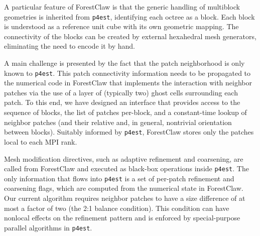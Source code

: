 \documentclass{IOS-Book-Article}     %
\newcommand{\comment}[1]{\textcolor{green}{[DAC: #1]}\xspace}
\newcommand{\clawpack}{{\sc Clawpack}\xspace}
\newcommand{\forestclaw}{ForestClaw\xspace}
\newcommand{\pforest}{\texttt{p4est}\xspace}
\newcommand{\ignore}[1]{}
\begin{document}
A particular feature of \forestclaw is that the generic handling of multiblock
geometries is inherited from \pforest, identifying each octree as a block.
Each block is understood as a reference unit cube with
its own geometric mapping.  The connectivity of the blocks can be created by
external hexahedral mesh generators, eliminating the need to encode it by hand.

A main challenge is presented by the fact that the patch neighborhood
is only known to \pforest.  This patch connectivity information needs
to be propagated to the numerical code in \forestclaw that implements
the interaction with neighbor patches via the use of a layer of (typically two)
ghost cells surrounding each patch.  To this end, we have designed an
interface that provides \ignore{read-only} access to the sequence of blocks, the list of
patches per-block, and a constant-time lookup of neighbor patches (and their
relative and, in general, nontrivial orientation between blocks).
Suitably informed by \pforest, \forestclaw stores only the patches local to
each MPI rank.

Mesh modification directives, such as adaptive refinement and coarsening, are
called from \forestclaw and executed as black-box operations inside \pforest.
The only information that flows into \pforest is a set of per-patch
refinement and coarsening flags, which are computed from the numerical state in
\forestclaw.  Our current algorithm requires neighbor patches to have a size
difference of at most a factor of two (the 2:1 balance condition).  This condition
can have nonlocal effects on the refinement pattern and is enforced by
special-purpose parallel algorithms in \pforest \cite{IsaacBursteddeGhattas12}.






\end{document}
